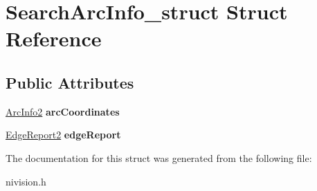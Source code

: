 \hypertarget{structSearchArcInfo__struct}{
\section{SearchArcInfo\_\-struct Struct Reference}
\label{structSearchArcInfo__struct}
}
\subsection*{Public Attributes}
\begin{DoxyCompactItemize}
\item 
\hypertarget{structSearchArcInfo__struct_aeee592f6eb7105576f9f82f43329e97a}{
\hyperlink{structArcInfo2__struct}{ArcInfo2} {\bfseries arcCoordinates}}
\label{structSearchArcInfo__struct_aeee592f6eb7105576f9f82f43329e97a}

\item 
\hypertarget{structSearchArcInfo__struct_a35e3ab8e1bcd86c4c07a72321539d386}{
\hyperlink{structEdgeReport2__struct}{EdgeReport2} {\bfseries edgeReport}}
\label{structSearchArcInfo__struct_a35e3ab8e1bcd86c4c07a72321539d386}

\end{DoxyCompactItemize}


The documentation for this struct was generated from the following file:\begin{DoxyCompactItemize}
\item 
nivision.h\end{DoxyCompactItemize}
